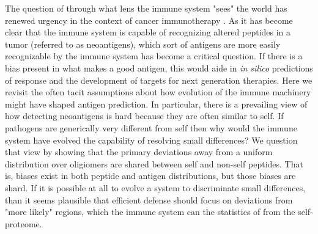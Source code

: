 \documentclass[superscriptaddress,twocolumn,pre]{revtex4}
\newcommand{\<}{\langle}
\renewcommand{\>}{\rangle}
\begin{document}
The question of through what lens the immune system "sees" the world has renewed urgency in the context of cancer immunotherapy \cite{Luksza,Balachandran,Vonderheide}. As it has become clear that the immune system is capable of recognizing altered peptides in a tumor (referred to as neoantigens), which sort of antigens are more easily recognizable by the immune system has become a critical question. If there is a bias present in what makes a good antigen, this would aide in {\it in silico} predictions of response and the development of targets for next generation therapies. Here we revisit the often tacit assumptions about how evolution of the immune machinery might have shaped antigen prediction. In particular, there is a prevailing view of how detecting neoantigens is hard because they are often similar to self. If pathogens are generically very different from self then why would the immune system have evolved the capability of resolving small differences? We question that view by showing that the primary deviations away from a uniform distribution over oligiomers are shared between self and non-self peptides. That is, biases exist in both peptide and antigen distributions, but those biases are shard. If it is possible at all to evolve a system to discriminate small differences, than it seems plausible that efficient defense should focus on deviations from "more likely" regions, which the immune system can the statistics of from the self-proteome.
\end{document}
